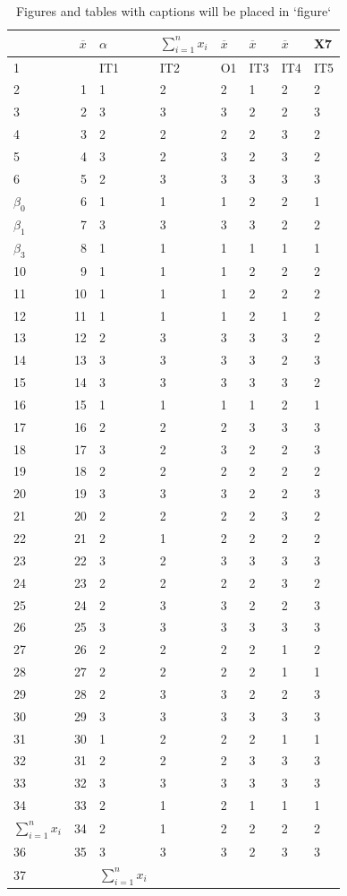 \documentclass[
  10pt,
]{krantz}
\theoremstyle{definition}
\theoremstyle{definition}
\theoremstyle{definition}
\theoremstyle{definition}
\theoremstyle{remark}
\begin{document}
\begin{longtable}[t]{lrllllll}
\caption{\label{tab:unnamed-chunk-46}Figures and tables with captions will be placed in `figure`}\\
\toprule
  & $\overline{x}$ & $\alpha$ & $\sum^{n}_{i=1}{x_i}$ & $\overline{x}$ & $\overline{x}$ & $\overline{x}$ & X7\\
\midrule
1 &  & IT1 & IT2 & O1 & IT3 & IT4 & IT5\\
2 & 1 & 1 & 2 & 2 & 1 & 2 & 2\\
3 & 2 & 3 & 3 & 3 & 2 & 2 & 3\\
4 & 3 & 2 & 2 & 2 & 2 & 3 & 2\\
5 & 4 & 3 & 2 & 3 & 2 & 3 & 2\\
6 & 5 & 2 & 3 & 3 & 3 & 3 & 3\\
$\beta_0$ & 6 & 1 & 1 & 1 & 2 & 2 & 1\\
$\beta_1$ & 7 & 3 & 3 & 3 & 3 & 2 & 2\\
$\beta_3$ & 8 & 1 & 1 & 1 & 1 & 1 & 1\\
10 & 9 & 1 & 1 & 1 & 2 & 2 & 2\\
11 & 10 & 1 & 1 & 1 & 2 & 2 & 2\\
12 & 11 & 1 & 1 & 1 & 2 & 1 & 2\\
13 & 12 & 2 & 3 & 3 & 3 & 3 & 2\\
14 & 13 & 3 & 3 & 3 & 3 & 2 & 3\\
15 & 14 & 3 & 3 & 3 & 3 & 3 & 2\\
16 & 15 & 1 & 1 & 1 & 1 & 2 & 1\\
17 & 16 & 2 & 2 & 2 & 3 & 3 & 3\\
18 & 17 & 3 & 2 & 3 & 2 & 2 & 3\\
19 & 18 & 2 & 2 & 2 & 2 & 2 & 2\\
20 & 19 & 3 & 3 & 3 & 2 & 2 & 3\\
21 & 20 & 2 & 2 & 2 & 2 & 3 & 2\\
22 & 21 & 2 & 1 & 2 & 2 & 2 & 2\\
23 & 22 & 3 & 2 & 3 & 3 & 3 & 3\\
24 & 23 & 2 & 2 & 2 & 2 & 3 & 2\\
25 & 24 & 2 & 3 & 3 & 2 & 2 & 3\\
26 & 25 & 3 & 3 & 3 & 3 & 3 & 3\\
27 & 26 & 2 & 2 & 2 & 2 & 1 & 2\\
28 & 27 & 2 & 2 & 2 & 2 & 1 & 1\\
29 & 28 & 2 & 3 & 3 & 2 & 2 & 3\\
30 & 29 & 3 & 3 & 3 & 3 & 3 & 3\\
31 & 30 & 1 & 2 & 2 & 2 & 1 & 1\\
32 & 31 & 2 & 2 & 2 & 3 & 3 & 3\\
33 & 32 & 3 & 3 & 3 & 3 & 3 & 3\\
34 & 33 & 2 & 1 & 2 & 1 & 1 & 1\\
$\sum^{n}_{i=1}{x_i}$ & 34 & 2 & 1 & 2 & 2 & 2 & 2\\
36 & 35 & 3 & 3 & 3 & 2 & 3 & 3\\
37 &  & $\sum_{i=1}^nx_i$ &  &  &  &  & \\
\bottomrule
\end{longtable}

  

\printindex
\end{document}
